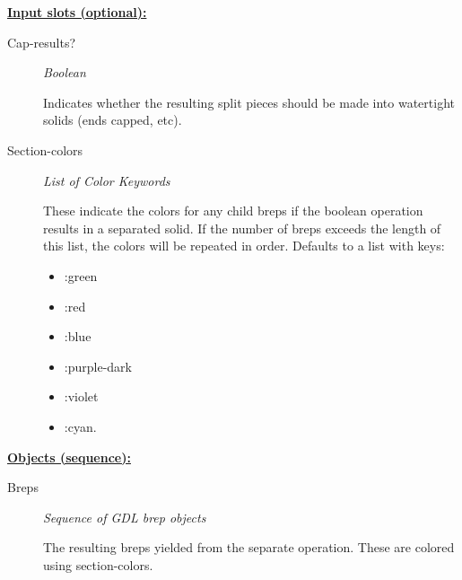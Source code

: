 \documentclass [11pt]{book}
\begin{document}
\begin{itemize}
\textbf{
\underline{Input slots (optional):}}

\begin{description}

\item [Cap-results?]
\emph{Boolean}

 Indicates whether the resulting split pieces should be made into watertight solids (ends capped, etc).




\item [Section-colors]
\emph{List of Color Keywords}

 These indicate the colors for any child breps if the boolean operation results in
a separated solid. If the number of breps exceeds the length of this list, the colors will be
repeated in order. Defaults to a list with keys:


\begin{itemize}

\item  :green 

\item  :red 

\item  :blue 

\item  :purple-dark 

\item  :violet 

\item  :cyan. 

\end{itemize}





\end{description}






\textbf{
\underline{Objects (sequence):}}

\begin{description}

\item [Breps]
\emph{Sequence of GDL brep objects}

 The resulting breps yielded from the separate operation. These are colored using section-colors.




\end{description}








\end{itemize}
\end{document}
